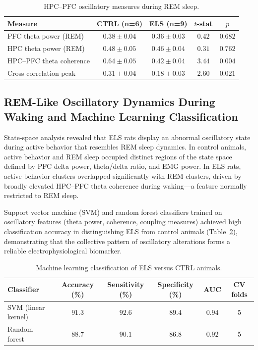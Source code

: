 \documentclass[11pt]{article}
\begin{document}
\begin{table}[H]
\centering
\caption{HPC--PFC oscillatory measures during REM sleep.}
\label{tab:rem}
\begin{tabular}{lcccc}
\toprule
\textbf{Measure} & \textbf{CTRL (n=6)} & \textbf{ELS (n=9)} & \textbf{$t$-stat} & \textbf{$p$} \\
\midrule
PFC theta power (REM) & $0.38 \pm 0.04$ & $0.36 \pm 0.03$ & $0.42$ & $0.682$ \\
HPC theta power (REM) & $0.48 \pm 0.05$ & $0.46 \pm 0.04$ & $0.31$ & $0.762$ \\
HPC--PFC theta coherence & $0.64 \pm 0.05$ & $0.42 \pm 0.04$ & $3.44$ & $0.004$ \\
Cross-correlation peak & $0.31 \pm 0.04$ & $0.18 \pm 0.03$ & $2.60$ & $0.021$ \\
\bottomrule
\end{tabular}
\end{table}

\subsection{REM-Like Oscillatory Dynamics During Waking and Machine Learning Classification}

State-space analysis revealed that ELS rats display an abnormal oscillatory state during active behavior that resembles REM sleep dynamics. In control animals, active behavior and REM sleep occupied distinct regions of the state space defined by PFC delta power, theta/delta ratio, and EMG power. In ELS rats, active behavior clusters overlapped significantly with REM clusters, driven by broadly elevated HPC--PFC theta coherence during waking---a feature normally restricted to REM sleep.

Support vector machine (SVM) and random forest classifiers trained on oscillatory features (theta power, coherence, coupling measures) achieved high classification accuracy in distinguishing ELS from control animals (Table~\ref{tab:ml}), demonstrating that the collective pattern of oscillatory alterations forms a reliable electrophysiological biomarker.

\begin{table}[H]
\centering
\caption{Machine learning classification of ELS versus CTRL animals.}
\label{tab:ml}
\begin{tabular}{lccccc}
\toprule
\textbf{Classifier} & \textbf{Accuracy (\%)} & \textbf{Sensitivity (\%)} & \textbf{Specificity (\%)} & \textbf{AUC} & \textbf{CV folds} \\
\midrule
SVM (linear kernel) & $91.3$ & $92.6$ & $89.4$ & $0.94$ & 5 \\
Random forest & $88.7$ & $90.1$ & $86.8$ & $0.92$ & 5 \\
\bottomrule
\end{tabular}
\end{table}
\end{document}
